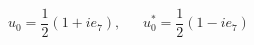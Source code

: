 \begin{equation}                      
u_{0} = \frac{1}{2} (1 +i e_{7}) ,                      
~~~~~~~u_{0}^{*} = \frac{1}{2} (1 -i e_{7})  \label{eq:ellisekiz}                     
\end{equation} 
